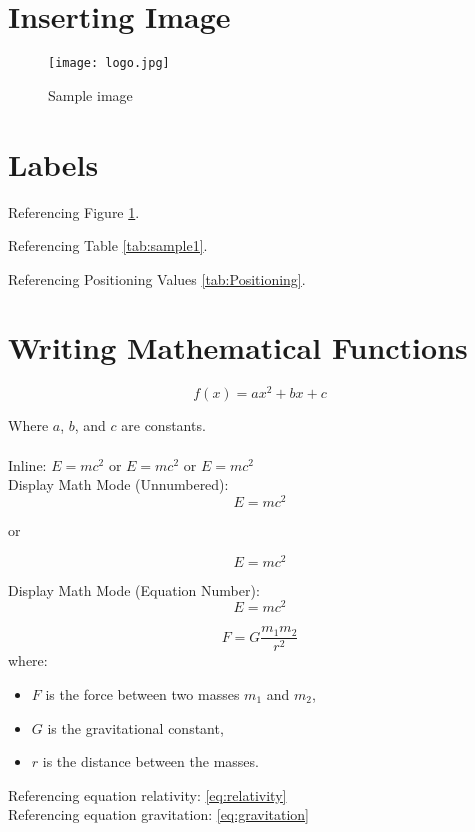 \newpage
\section{Inserting Image}
\begin{figure}[h!]
  \centering
  \texttt{[image: logo.jpg]}
  \caption{Sample image}
  \label{fig:sample}
\end{figure}

\section{Labels}
Referencing Figure \ref{fig:sample}.

Referencing Table \ref{tab:sample1}.

Referencing Positioning Values \ref{tab:Positioning}.

\newpage
\section{Writing Mathematical Functions}

\[
f(x) = ax^2 + bx + c
\]

Where \(a\), \(b\), and \(c\) are constants.\\\\

Inline: \( E = mc^2 \) or $ E = mc^2 $ or \begin{math} E = mc^2 \end{math}\\

Display Math Mode (Unnumbered):
\begin{displaymath}
    E = mc^2
\end{displaymath}

or

\[E = mc^2\]

Display Math Mode (Equation Number):
\begin{equation}
    \label{eq:relativity}
    E = mc^2
\end{equation}



\begin{equation} 
    \label{eq:gravitation}
    F = G \frac{m_1 m_2}{r^2}
\end{equation}
where:
\begin{itemize}
    \item \( F \) is the force between two masses \( m_1 \) and \( m_2 \),
    \item \( G \) is the gravitational constant,
    \item \( r \) is the distance between the masses.
\end{itemize}

Referencing equation relativity: \ref{eq:relativity}\\
Referencing equation gravitation: \ref{eq:gravitation}

